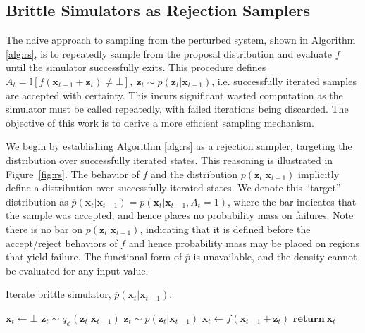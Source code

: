 \subsection{Brittle Simulators as Rejection Samplers}
\label{sec:meth:rs}
The naive approach to sampling from the perturbed system, shown in Algorithm \ref{alg:rs}, is to repeatedly sample from the proposal distribution and evaluate $f$ until the simulator successfully exits.
This procedure defines $A_t = \mathbb{I} \left[ f(\mathbf{x}_{t-1} + \mathbf{z}_t) \neq \bot \right],\ \mathbf{z}_t \sim p(\mathbf{z}_t | \mathbf{x}_{t-1})$, i.e. successfully iterated samples are accepted with certainty.
This incurs significant wasted computation as the simulator must be called repeatedly, with failed iterations being discarded.
The objective of this work is to derive a more efficient sampling mechanism. 

We begin by establishing Algorithm \ref{alg:rs} as a rejection sampler, targeting the distribution over successfully iterated states.
This reasoning is illustrated in Figure~\ref{fig:rs}.
The behavior of $f$ and the distribution $p(\mathbf{z}_t | \mathbf{x}_{t-1})$ implicitly define a distribution over successfully iterated states.
We denote this ``target'' distribution as $\overline{p}(\mathbf{x}_t | \mathbf{x}_{t-1}) = p(\mathbf{x}_t | \mathbf{x}_{t-1}, A_t = 1)$, where the bar indicates that the sample was accepted, and hence places no probability mass on failures.
Note there is no bar on $p(\mathbf{z}_t | \mathbf{x}_{t-1})$, indicating that it is defined before the accept/reject behaviors of $f$ and hence probability mass may be placed on regions that yield failure.
The functional form of $\overline{p}$ is unavailable, and the density cannot be evaluated for any input value.

\begin{algorithm}[t]
 \caption{Iterate brittle simulator, $\overline{p}(\mathbf{x}_t | \mathbf{x}_{t-1})$.}\label{alg:rs}
 \begin{algorithmic}[1]
     \State $\mathbf{x}_t \gets \bot$
      \State $\mathbf{z}_t \sim q_{\phi}(\mathbf{z}_t | \mathbf{x}_{t-1})$  \label{alg:meth:brittle:p}
      \Else
      \State $\mathbf{z}_t \sim p(\mathbf{z}_t | \mathbf{x}_{t-1})$ 
      \EndIf
      \State $\mathbf{x}_t \gets f( \mathbf{x}_{t-1} + \mathbf{z}_t)$ 
     \EndWhile
     \State $\textbf{return}\ \mathbf{x}_t$
  \EndProcedure
 \end{algorithmic}
\end{algorithm}

